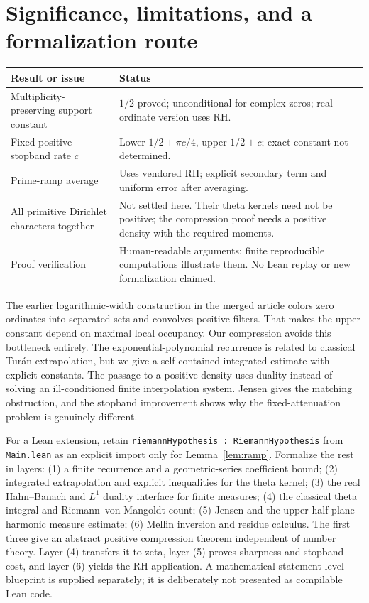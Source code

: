 \documentclass[11pt]{article}
\theoremstyle{remark}\newtheorem{remark}[theorem]{Remark}
\begin{document}
\section{Significance, limitations, and a formalization route}
\label{sec:status}
\begin{center}\small
\begin{tabular}{@{}>{\raggedright\arraybackslash}p{.37\linewidth}>{\raggedright\arraybackslash}p{.56\linewidth}@{}}
\toprule
Result or issue & Status\\\midrule
Multiplicity-preserving support constant & $1/2$ proved; unconditional for complex zeros; real-ordinate version uses RH.\\[3pt]
Fixed positive stopband rate $c$ & Lower $1/2+\pi c/4$, upper $1/2+c$; exact constant not determined.\\[3pt]
Prime-ramp average & Uses vendored RH; explicit secondary term and uniform error after averaging.\\[3pt]
All primitive Dirichlet characters together & Not settled here. Their theta kernels need not be positive; the compression proof needs a positive density with the required moments.\\[3pt]
Proof verification & Human-readable arguments; finite reproducible computations illustrate them. No Lean replay or new formalization claimed.\\\bottomrule
\end{tabular}
\end{center}

The earlier logarithmic-width construction in the merged article colors zero ordinates into separated sets and convolves positive filters. That makes the upper constant depend on maximal local occupancy. Our compression avoids this bottleneck entirely. The exponential-polynomial recurrence is related to classical Tur\'an extrapolation, but we give a self-contained integrated estimate with explicit constants. The passage to a positive density uses duality instead of solving an ill-conditioned finite interpolation system. Jensen gives the matching obstruction, and the stopband improvement shows why the fixed-attenuation problem is genuinely different.

For a Lean extension, retain \texttt{riemannHypothesis : RiemannHypothesis} from \texttt{Main.lean} as an explicit import only for Lemma~\ref{lem:ramp}. Formalize the rest in layers: (1) a finite recurrence and a geometric-series coefficient bound; (2) integrated extrapolation and explicit inequalities for the theta kernel; (3) the real Hahn--Banach and $L^1$ duality interface for finite measures; (4) the classical theta integral and Riemann--von Mangoldt count; (5) Jensen and the upper-half-plane harmonic measure estimate; (6) Mellin inversion and residue calculus. The first three give an abstract positive compression theorem independent of number theory. Layer (4) transfers it to zeta, layer (5) proves sharpness and stopband cost, and layer (6) yields the RH application. A mathematical statement-level blueprint is supplied separately; it is deliberately not presented as compilable Lean code.
\end{document}
